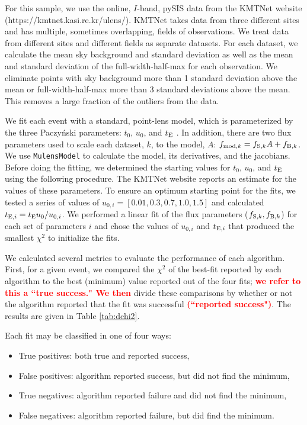 \documentclass[preprint]{aastex631}
\newcommand{\HL}[1]{\textcolor{red}{\bf#1}}
\begin{document}
For this sample, we use the online, $I$-band, pySIS \citep{Albrow09} data  from the KMTNet website (https://kmtnet.kasi.re.kr/ulens/). KMTNet takes data from three different sites and has multiple, sometimes overlapping, fields of observations. We treat data from different sites and different fields as separate datasets. For each dataset, we calculate the mean sky background and standard deviation as well as the mean and standard deviation of the full-width-half-max for each observation. We eliminate points with sky background more than 1 standard deviation above the mean or full-width-half-max more than 3 standard deviations above the mean. This removes a large fraction of the outliers from the data.

We fit each event with a standard, point-lens model, which is parameterized by the three Paczy\'{n}ski parameters: $t_0$, $u_0$, and $t_{\rm E}$ \citep[for the definitions of these parameters see, e.g.,][]{Gaudi12}. In addition, there are two flux parameters used to scale each dataset, $k$, to the model, $A$: 
$f_{{\rm mod}, k} = f_{{\rm S}, k} A + f_{{\rm B}, k}$.
We use \texttt{MulensModel} \citep{MulensModel} to calculate the model, its derivatives, and the jacobians. Before doing the fitting, we determined the starting values for $t_0$, $u_0$, and $t_{\rm E}$ using the following procedure. The KMTNet website reports an estimate for the values of these parameters. To ensure an optimum starting point for the fits, we tested a series of values of $u_{0, i} = [0.01, 0.3, 0.7, 1.0, 1.5]$ and calculated $t_{{\rm E}, i} = t_{\rm E} u_0 / u_{0, i}$. We performed a linear fit of the flux parameters ($f_{{\rm S}, k}, f_{{\rm B}, k}$) for each set of parameters $i$ and chose the values of $u_{0, i}$ and $t_{{\rm E}, i}$ that produced the smallest $\chi^2$ to initialize the fits.

We calculated several metrics to evaluate the performance of each algorithm. First, for a given event, we compared the $\chi^2$ of the best-fit reported by each algorithm to the best (minimum) value reported out of the four fits; \HL{we refer to this a ``true success." We then} divide these comparisons by whether or not the algorithm reported that the fit was successful \HL{(``reported success")}. The results are given in Table \ref{tab:dchi2}. 

Each fit may be classified in one of four ways:
\begin{itemize}
\item{True positives: both true and reported success,}
\item{False positives: algorithm reported success, but did not find the minimum,}
\item{True negatives: algorithm reported failure and did not find the minimum,}
\item{False negatives: algorithm reported failure, but did find the minimum.}
\end{itemize}
\end{document}

